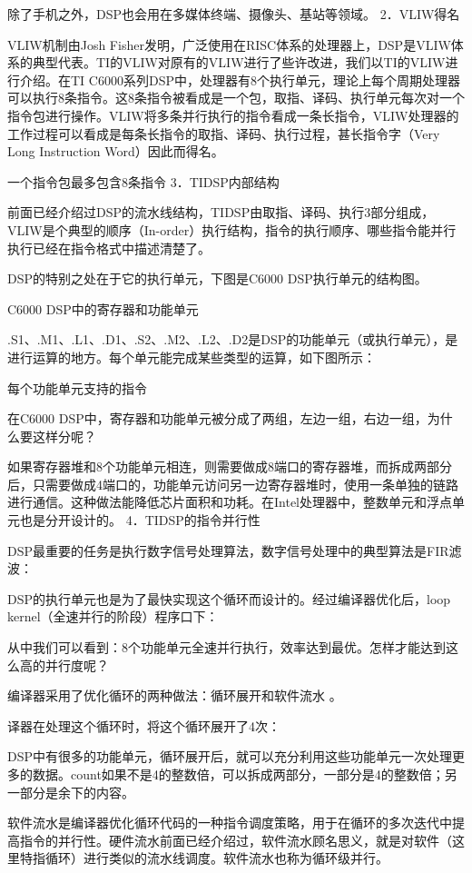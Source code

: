 \documentclass[12pt,UTF8]{ctexbook}
\begin{document}
除了手机之外，DSP也会用在多媒体终端、摄像头、基站等领域。
2．VLIW得名

VLIW机制由Josh Fisher发明，广泛使用在RISC体系的处理器上，DSP是VLIW体系的典型代表。TI的VLIW对原有的VLIW进行了些许改进，我们以TI的VLIW进行介绍。在TI C6000系列DSP中，处理器有8个执行单元，理论上每个周期处理器可以执行8条指令。这8条指令被看成是一个包，取指、译码、执行单元每次对一个指令包进行操作。VLIW将多条并行执行的指令看成一条长指令，VLIW处理器的工作过程可以看成是每条长指令的取指、译码、执行过程，甚长指令字（Very Long Instruction Word）因此而得名。

一个指令包最多包含8条指令
3．TIDSP内部结构

前面已经介绍过DSP的流水线结构，TIDSP由取指、译码、执行3部分组成，VLIW是个典型的顺序（In-order）执行结构，指令的执行顺序、哪些指令能并行执行已经在指令格式中描述清楚了。

DSP的特别之处在于它的执行单元，下图是C6000 DSP执行单元的结构图。

C6000 DSP中的寄存器和功能单元

.S1、.M1、.L1、.D1、.S2、.M2、.L2、.D2是DSP的功能单元（或执行单元），是进行运算的地方。每个单元能完成某些类型的运算，如下图所示：

每个功能单元支持的指令

在C6000 DSP中，寄存器和功能单元被分成了两组，左边一组，右边一组，为什么要这样分呢？

如果寄存器堆和8个功能单元相连，则需要做成8端口的寄存器堆，而拆成两部分后，只需要做成4端口的，功能单元访问另一边寄存器堆时，使用一条单独的链路进行通信。这种做法能降低芯片面积和功耗。在Intel处理器中，整数单元和浮点单元也是分开设计的。
4．TIDSP的指令并行性

DSP最重要的任务是执行数字信号处理算法，数字信号处理中的典型算法是FIR滤波：

DSP的执行单元也是为了最快实现这个循环而设计的。经过编译器优化后，loop kernel（全速并行的阶段）程序口下：

从中我们可以看到：8个功能单元全速并行执行，效率达到最优。怎样才能达到这么高的并行度呢？

编译器采用了优化循环的两种做法：循环展开和软件流水 。

译器在处理这个循环时，将这个循环展开了4次：

DSP中有很多的功能单元，循环展开后，就可以充分利用这些功能单元一次处理更多的数据。count如果不是4的整数倍，可以拆成两部分，一部分是4的整数倍；另一部分是余下的内容。

软件流水是编译器优化循环代码的一种指令调度策略，用于在循环的多次迭代中提高指令的并行性。硬件流水前面已经介绍过，软件流水顾名思义，就是对软件（这里特指循环）进行类似的流水线调度。软件流水也称为循环级并行。
\end{document}
